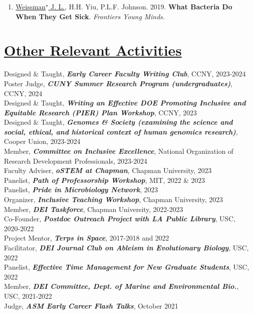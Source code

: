 \documentclass[]{res}
\begin{document}
\begin{resume}
\begin{enumerate}[leftmargin=*]
\item \underline{Weissman$^\star$ J. L.}, H.H. Yiu, P.L.F. Johnson. 2019. {\bf What Bacteria Do When They Get Sick}. \emph{Frontiers Young Minds.}

  \end{enumerate} 


\section{\underline{Other Relevant Activities}} \vspace{2mm}
Designed \& Taught, \emph{\bf Early Career Faculty Writing Club}, CCNY, 2023-2024\\
{Poster Judge,} \emph{\bf CUNY Summer Research Program (undergraduates)}, CCNY, 2024\\
Designed \& Taught, \emph{\bf Writing an Effective DOE Promoting Inclusive and Equitable Research (PIER) Plan Workshop}, CCNY, 2023\\
Designed \& Taught, \emph{\bf Genomes \& Society (examining the science and social, ethical, and historical context of human genomics research)}, Cooper Union, 2023-2024\\
{Member,} \emph{\bf Committee on Inclusive Excellence}, National Organization of Research Development Professionals, 2023-2024\\
{Faculty Adviser,} \emph{\bf oSTEM at Chapman}, Chapman University, 2023\\
{Panelist,} \emph{\bf Path of Professorship Workshop}, MIT, 2022 \& 2023\\
{Panelist,} \emph{\bf Pride in Microbiology Network}, 2023\\
{Organizer,} \emph{\bf Inclusive Teaching Workshop}, Chapman University, 2023\\
{Member,} \emph{\bf DEI Taskforce}, Chapman University, 2022-2023\\
{Co-Founder,} \emph{\bf Postdoc Outreach Project with LA Public Library}, USC, 2020-2022\\
{Project Mentor,} \emph{\bf Terps in Space}, 2017-2018 and 2022\\
{Facilitator,} \emph{\bf DEI Journal Club on Ableism in Evolutionary Biology}, USC, 2022\\
{Panelist,} \emph{\bf Effective Time Management for New Graduate Students}, USC, 2022\\
{Member,} \emph{\bf DEI Committee, Dept. of Marine and Environmental Bio.}, USC, 2021-2022\\
{Judge,} \emph{\bf ASM Early Career Flash Talks}, October 2021\\

\end{resume}
\end{document}

